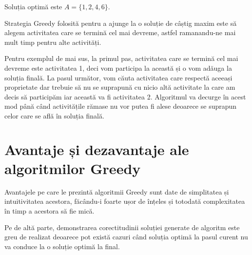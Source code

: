 \par
Soluția optimă este $A = \{1, 2, 4, 6  \} $.
\par 
Strategia Greedy folosită pentru a ajunge la o soluție de câștig maxim este să alegem activitatea care se termină cel mai devreme, astfel ramanandu-ne mai mult timp pentru alte activități. \par 
Pentru exemplul de mai sus, la primul pas,  activitatea care se termină cel mai devreme este activitatea 1, deci vom participa la această și o vom adăuga la soluția finală.  La pasul următor, vom căuta activitatea care respectă aceeași proprietate dar trebuie să nu se suprapună cu nicio altă activitate la care am decis să participăm iar această va fi activitatea 2. Algoritmul va decurge în acest mod până când activitățile rămase nu vor putea fi alese deoarece se suprapun celor care se află în soluția finală.


\section{Avantaje și dezavantaje ale algoritmilor Greedy}				
Avantajele pe care le prezintă algoritmii Greedy sunt date de simplitatea și intuitivitatea acestora, făcându-i foarte ușor de înțeles și totodată complexitatea în timp a acestora să fie mică. \par
Pe de altă parte, demonstrarea corectitudinii soluției generate de algoritm este greu de realizat deoarece pot există cazuri când soluția optimă la pasul curent nu va conduce la o soluție optimă la final.



